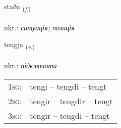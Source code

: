 \documentclass[frontgrid, backgrid]{flacards}\usepackage[]{graphicx}\usepackage[]{xcolor}
\begin{document}
\renewcommand{\blhead}{\vskip5pt {\small\bfseries\footnotesize Nafnorð | іменник }}
\renewcommand{\bcfoot}{\vskip5pt \hspace{2pt}{\small\bfseries\footnotesize 1K}}


{staða \small{\textsubscript{(\textit{f.})}} \\[1ex] %
\textphonetic{[staːða]} \\
ukr.: \emph{ситуація; позиція} \\  [2ex]
\renewcommand*{\arraystretch}{0.8}
}

\renewcommand{\flhead}{\vskip5pt \fboxsep=0pt {\small\bfseries\footnotesize Sagnorð | дієслово}}
\renewcommand{\fcfoot}{\vskip5pt \fboxsep=0pt \hspace{2pt}{\small\bfseries\footnotesize 1K}}

\renewcommand{\blhead}{\vskip5pt {\small\bfseries\footnotesize Sagnorð | дієслово }}
\renewcommand{\bcfoot}{\vskip5pt \hspace{2pt}{\small\bfseries\footnotesize 1K}}


{tengja \small{\textsubscript{(\textit{v.})}} \\[1ex] %
\textphonetic{[tʰeiɲca]} \\
ukr.: \emph{підключати} \\  [2ex]
\renewcommand*{\arraystretch}{0.8}
\begin{tabular}{p{1cm}l}
\textsc{1sg}: & tengi -- tengdi -- tengt \\ 
\textsc{2sg}: & tengir -- tengdir -- tengt \\ 
\textsc{3sg}: & tengir -- tengdi -- tengt \\ 
\end{tabular}
}
\end{document}
